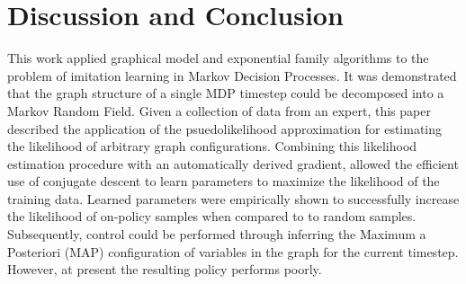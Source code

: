 \documentclass{article} %
\begin{document}
\section{Discussion and Conclusion}
This work applied graphical model and exponential family algorithms to the
problem of imitation learning in Markov Decision Processes. It was
demonstrated that the graph structure of a single MDP timestep could be
decomposed into a Markov Random Field. Given a collection of data from an
expert, this paper described the application of the psuedolikelihood
approximation for estimating the likelihood of arbitrary graph configurations.
Combining this likelihood estimation procedure with an automatically derived
gradient, allowed the efficient use of conjugate descent to learn parameters to
maximize the likelihood of the training data. Learned parameters were
empirically shown to successfully increase the likelihood of on-policy samples
when compared to to random samples. Subsequently, control could be performed
through inferring the Maximum a Posteriori (MAP) configuration of variables in
the graph for the current timestep. However, at present the resulting policy 
performs poorly.



\end{document}
